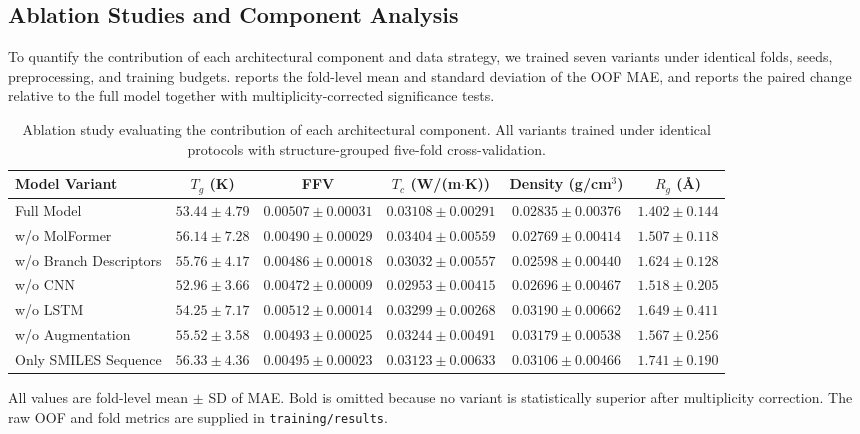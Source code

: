 \documentclass{article}
\begin{document}
\subsection{Ablation Studies and Component Analysis}

To quantify the contribution of each architectural component and data strategy, we trained seven variants under identical folds, seeds, preprocessing, and training budgets.  reports the fold-level mean and standard deviation of the OOF MAE, and  reports the paired change relative to the full model together with multiplicity-corrected significance tests.

\begin{table}[H]
\centering
\caption{Ablation study evaluating the contribution of each architectural component. All variants trained under identical protocols with structure-grouped five-fold cross-validation.}
\label{tab:ablation}
\footnotesize
\setlength{\tabcolsep}{3.2pt}
\begin{tabular}{lccccc}
\toprule
\textbf{Model Variant} & \textbf{$T_g$ (K)} & \textbf{FFV} & \textbf{$T_c$ (W/(m$\cdot$K))} & \textbf{Density (g/cm$^3$)} & \textbf{$R_g$ (\AA)} \\
\midrule
Full Model & $53.44 \pm 4.79$ & $0.00507 \pm 0.00031$ & $0.03108 \pm 0.00291$ & $0.02835 \pm 0.00376$ & $1.402 \pm 0.144$ \\
w/o MolFormer & $56.14 \pm 7.28$ & $0.00490 \pm 0.00029$ & $0.03404 \pm 0.00559$ & $0.02769 \pm 0.00414$ & $1.507 \pm 0.118$ \\
w/o Branch Descriptors & $55.76 \pm 4.17$ & $0.00486 \pm 0.00018$ & $0.03032 \pm 0.00557$ & $0.02598 \pm 0.00440$ & $1.624 \pm 0.128$ \\
w/o CNN & $52.96 \pm 3.66$ & $0.00472 \pm 0.00009$ & $0.02953 \pm 0.00415$ & $0.02696 \pm 0.00467$ & $1.518 \pm 0.205$ \\
w/o LSTM & $54.25 \pm 7.17$ & $0.00512 \pm 0.00014$ & $0.03299 \pm 0.00268$ & $0.03190 \pm 0.00662$ & $1.649 \pm 0.411$ \\
w/o Augmentation & $55.52 \pm 3.58$ & $0.00493 \pm 0.00025$ & $0.03244 \pm 0.00491$ & $0.03179 \pm 0.00538$ & $1.567 \pm 0.256$ \\
Only SMILES Sequence & $56.33 \pm 4.36$ & $0.00495 \pm 0.00023$ & $0.03123 \pm 0.00633$ & $0.03106 \pm 0.00466$ & $1.741 \pm 0.190$ \\
\bottomrule
\end{tabular}

\vspace{0.5em}
\footnotesize
All values are fold-level mean $\pm$ SD of MAE. Bold is omitted because no variant is statistically superior after multiplicity correction. The raw OOF and fold metrics are supplied in \texttt{training/results}.
\end{table}
\end{document}
